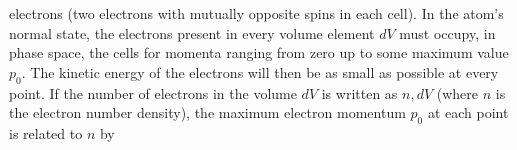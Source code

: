 electrons (two electrons with mutually opposite spins in each cell). In the atom's normal state, the electrons present in every volume element $dV$ must occupy, in phase space, the cells for momenta ranging from zero up to some maximum value $p_0$. The kinetic energy of the electrons will then be as small as possible at every point. If the number of electrons in the volume $dV$ is written as $n,dV$ (where $n$ is the electron number density), the maximum electron momentum $p_0$ at each point is related to $n$ by
